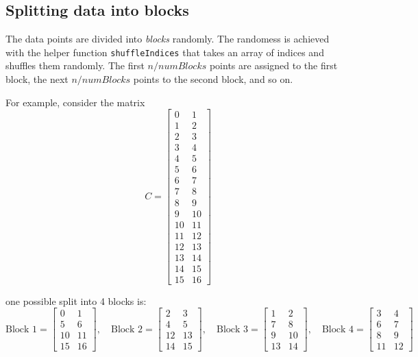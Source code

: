 \documentclass{article}
\begin{document}
\subsection{Splitting data into blocks}
The data points are divided into \emph{blocks} randomly. The randomess is achieved with the helper 
function \texttt{shuffleIndices} that takes an array of indices and shuffles them randomly. The first $n / numBlocks$ 
points are assigned to the first block, the next $n / numBlocks$ points to the second block, and so on.

For example, consider the matrix 
\[
C = \begin{bmatrix}
0 & 1 \\
1 & 2 \\
2 & 3 \\
3 & 4 \\
4 & 5 \\
5 & 6 \\
6 & 7 \\
7 & 8 \\
8 & 9 \\
9 & 10 \\
10 & 11 \\
11 & 12 \\
12 & 13 \\
13 & 14 \\
14 & 15 \\
15 & 16
\end{bmatrix}
\]

one possible split into 4 blocks is:
\[
\text{Block 1} = \begin{bmatrix}
0 & 1 \\
5 & 6 \\
10 & 11 \\
15 & 16
\end{bmatrix}, \quad
\text{Block 2} = \begin{bmatrix}
2 & 3 \\
4 & 5 \\
12 & 13 \\
14 & 15
\end{bmatrix}, \quad
\text{Block 3} = \begin{bmatrix}
1 & 2 \\
7 & 8 \\
9 & 10 \\
13 & 14
\end{bmatrix}, \quad
\text{Block 4} = \begin{bmatrix}
3 & 4 \\
6 & 7 \\
8 & 9 \\
11 & 12
\end{bmatrix}
\]
\end{document}
